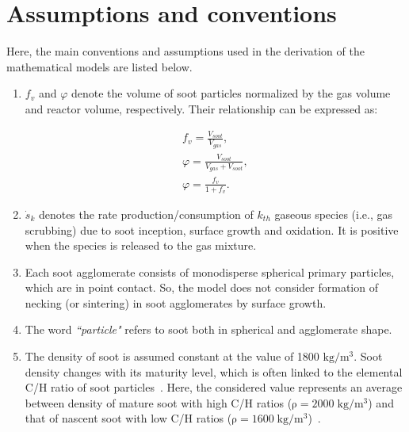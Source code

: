 \section{Assumptions and conventions}
Here, the main conventions and assumptions used in the derivation of the mathematical models are listed below.

\begin{enumerate}
	
	\item $f_v$ and $\varphi$ denote the volume of soot particles normalized by the gas volume and reactor volume, respectively. Their relationship can be expressed as:
	
	\begin{equation}
		\begin{split}
			f_v = \frac{V_{soot}}{V_{gas}}, \\
			\varphi = \frac{V_{soot}}{V_{gas} + V_{soot}}, \\
			\varphi = \frac{f_v}{1 + f_v}
			\label{eqn:fvdef}.
		\end{split}
	\end{equation}
	
	\item ${\dot{s}_k}$ denotes the rate production/consumption of $k_{th}$ gaseous species (i.e., gas scrubbing) due to soot inception, surface growth and oxidation. It is positive when the species is released to the gas mixture.
	
	\item Each soot agglomerate consists of monodisperse spherical primary particles, which are in point contact. So, the model does not consider formation of necking (or sintering) in soot agglomerates by surface growth.
	
	
	\item The word \textit{``particle"} refers to soot both in spherical and agglomerate shape. 
	
	\item The density of soot is assumed constant at the value of 1800 $\mathrm{kg/m^3}$. Soot density changes with its maturity level, which is often linked to the elemental C/H ratio of soot particles~\citep{michelsen2021effects}. Here, the considered value represents an average between density of mature soot with high C/H ratios ($\mathrm{\rho=2000\;kg/m^3}$) and that of nascent soot with low C/H ratios ($\mathrm{\rho=1600\;kg/m^3}$)~\citep{jensen2007measurement, michelsen2021effects}.
	

\end{enumerate}

